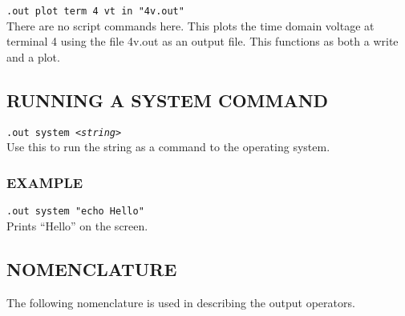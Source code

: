 {\tt .out plot term 4 vt in "4v.out"} \medskip
\\
There are no script commands here. This plots the time domain voltage
at terminal 4 using the file 4v.out as an output file. This functions
as both a write and a plot.

\subsection[Running a system command]{RUNNING A SYSTEM COMMAND}

{\tt .out system <{\it string}>} \medskip
\\
Use this to run the string as a command to the operating system.

\subsubsection[Example]{EXAMPLE} 

{\tt .out system "echo Hello"} \medskip 
\\
Prints ``Hello'' on the screen.

\subsection[Nomenclature]{NOMENCLATURE}

The following nomenclature is used in describing the output operators.


